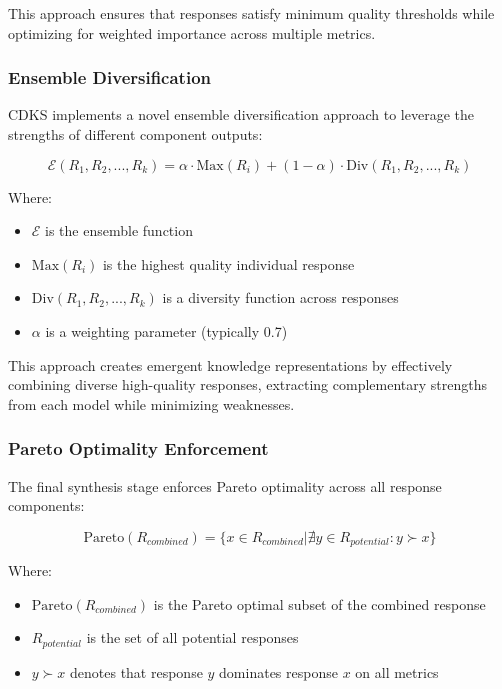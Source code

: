 \documentclass[journal,onecolumn]{IEEEtran}
\begin{document}
This approach ensures that responses satisfy minimum quality thresholds while optimizing for weighted importance across multiple metrics.

\subsubsection{Ensemble Diversification}

CDKS implements a novel ensemble diversification approach to leverage the strengths of different component outputs:

\begin{equation}
\mathcal{E}(R_1, R_2, ..., R_k) = \alpha \cdot \text{Max}(R_i) + (1-\alpha) \cdot \text{Div}(R_1, R_2, ..., R_k)
\end{equation}

Where:
\begin{itemize}
\item $\mathcal{E}$ is the ensemble function
\item $\text{Max}(R_i)$ is the highest quality individual response
\item $\text{Div}(R_1, R_2, ..., R_k)$ is a diversity function across responses
\item $\alpha$ is a weighting parameter (typically 0.7)
\end{itemize}

This approach creates emergent knowledge representations by effectively combining diverse high-quality responses, extracting complementary strengths from each model while minimizing weaknesses.

\subsubsection{Pareto Optimality Enforcement}

The final synthesis stage enforces Pareto optimality across all response components:

\begin{equation}
\text{Pareto}(R_{combined}) = \{x \in R_{combined} | \nexists y \in R_{potential}: y \succ x\}
\end{equation}

Where:
\begin{itemize}
\item $\text{Pareto}(R_{combined})$ is the Pareto optimal subset of the combined response
\item $R_{potential}$ is the set of all potential responses
\item $y \succ x$ denotes that response $y$ dominates response $x$ on all metrics
\end{itemize}
\end{document}
